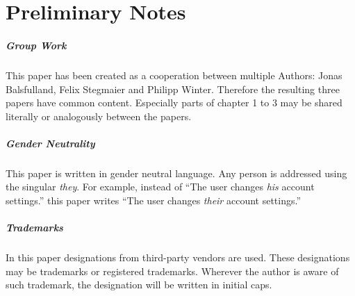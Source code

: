 \clearpage
\chapter*{Preliminary Notes}
\thispagestyle{empty}


\paragraph{Group Work}
This paper has been created as a cooperation between multiple Authors: 
Jonas Balsfulland, Felix Stegmaier and Philipp Winter.
Therefore the resulting three papers have common content.
Especially parts of chapter 1 to 3 may be shared literally or analogously between the papers.



\paragraph{Gender Neutrality}
This paper is written in gender neutral language.
Any person is addressed using the singular \textit{they}.
For example, instead of 
``The user changes \textit{his} account settings.''
this paper writes 
``The user changes \textit{their} account settings.''


\paragraph{Trademarks}
In this paper designations from third-party vendors are used.
These designations may be trademarks or registered trademarks.
Wherever the author is aware of such trademark, 
the designation will be written in initial caps.


